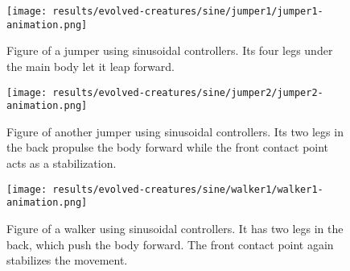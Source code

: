\documentclass[main]{subfiles}
\begin{document}
\begin{figure}[tb]
\centering
\texttt{[image: results/evolved-creatures/sine/jumper1/jumper1-animation.png]}
\caption[Figure of a jumper using sinusoidal controllers.]{Figure of a jumper using sinusoidal controllers. Its four legs under the main body let it leap forward.}
\label{figure:successfulcreatures-jumper1}
\end{figure}

\begin{figure}[tb]
\centering
\texttt{[image: results/evolved-creatures/sine/jumper2/jumper2-animation.png]}
\caption[Figure of another jumper using sinusoidal controllers.]{Figure of another jumper using sinusoidal controllers. Its two legs in the back propulse the body forward while the front contact point acts as a stabilization.}
\label{figure:successfulcreatures-jumper2}
\end{figure}

\begin{figure}[tb]
\centering
\texttt{[image: results/evolved-creatures/sine/walker1/walker1-animation.png]}
\caption[Figure of a walker using sinusoidal controllers.]{Figure of a walker using sinusoidal controllers. It has two legs in the back, which push the body forward. The front contact point again stabilizes the movement.}
\label{figure:successfulcreatures-walker1}
\end{figure}
\end{document}
